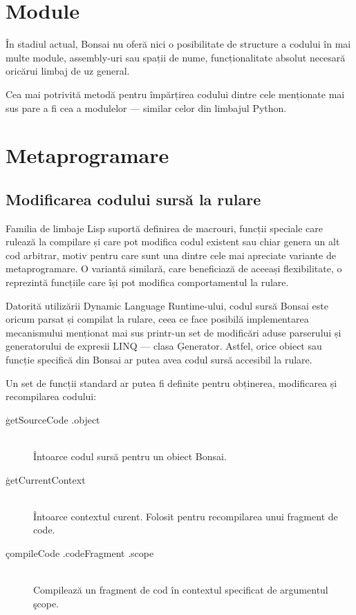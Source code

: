 \documentclass[12pt,a4paper]{memoir}
\begin{document}
\section{Module}

În stadiul actual, Bonsai nu oferă nici o posibilitate de structure a codului în mai multe module, assembly-uri sau spații de nume, funcționalitate absolut necesară oricărui limbaj de uz general.

Cea mai potrivită metodă pentru împărțirea codului dintre cele menționate mai sus pare a fi cea a modulelor — similar celor din limbajul Python. 

\section{Metaprogramare}

\subsection{Modificarea codului sursă la rulare} 

Familia de limbaje Lisp suportă definirea de macrouri, funcții speciale care rulează la compilare și care pot modifica codul existent sau chiar genera un alt cod arbitrar, motiv pentru care sunt una dintre cele mai apreciate variante de metaprogramare. O variantă similară, care beneficiază de aceeași flexibilitate, o reprezintă funcțiile care își pot modifica comportamentul la rulare. 

Datorită utilizării Dynamic Language Runtime-ului, codul sursă Bonsai este oricum parsat și compilat la rulare, ceea ce face posibilă implementarea mecanismului menționat mai sus printr-un set de modificări aduse parserului și generatorului de expresii LINQ — clasa \c{Generator}. Astfel, orice obiect sau funcție specifică din Bonsai ar putea avea codul sursă accesibil la rulare. 

Un set de funcții standard ar putea fi definite pentru obținerea, modificarea și recompilarea codului:

\begin{description}
\item[\c{getSourceCode .object}]\hfill\\ Întoarce codul sursă pentru un obiect Bonsai.
\item[\c{getCurrentContext}]\hfill\\ Întoarce contextul curent. Folosit pentru recompilarea unui fragment de code.
\item[\c{compileCode .codeFragment .scope}]\hfill\\ Compilează un fragment de cod în contextul specificat de argumentul \c{scope}. 
\end{description}
\end{document}
